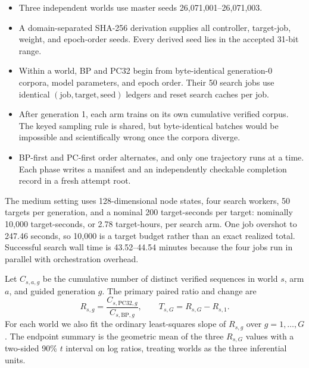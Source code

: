 \documentclass[11pt]{article}
\newcommand{\pc}{\mathrm{PC32}}
\newcommand{\bp}{\mathrm{BP}}
\begin{document}
\begin{itemize}
  \item Three independent worlds use master seeds 26,071,001--26,071,003.
  \item A domain-separated SHA-256 derivation supplies all controller, target-job, weight,
        and epoch-order seeds.  Every derived seed lies in the accepted 31-bit range.
  \item Within a world, BP and PC32 begin from byte-identical generation-0 corpora, model
        parameters, and epoch order.  Their 50 search jobs use identical
        $(\text{job},\text{target},\text{seed})$ ledgers and reset search caches per job.
  \item After generation 1, each arm trains on its own cumulative verified corpus.  The
        keyed sampling rule is shared, but byte-identical batches would be impossible and
        scientifically wrong once the corpora diverge.
  \item BP-first and PC-first order alternates, and only one trajectory runs at a time.
        Each phase writes a manifest and an independently checkable completion record in a
        fresh attempt root.
\end{itemize}

The medium setting uses 128-dimensional node states, four search workers, 50 targets per
generation, and a nominal 200 target-seconds per target: nominally 10,000 target-seconds,
or 2.78 target-hours, per search arm.  One job overshot to 247.46 seconds, so 10,000 is a
target budget rather than an exact realized total.  Successful search wall time is
43.52--44.54 minutes because the four jobs run in parallel with orchestration overhead.

Let $C_{s,a,g}$ be the cumulative number of distinct verified sequences in world $s$, arm
$a$, and guided generation $g$.  The primary paired ratio and change are
\[
  R_{s,g}=\frac{C_{s,\pc,g}}{C_{s,\bp,g}},
  \qquad
  T_{s,G}=R_{s,G}-R_{s,1}.
\]
For each world we also fit the ordinary least-squares slope of $R_{s,g}$ over
$g=1,\ldots,G$.  The endpoint summary is the geometric mean of the three $R_{s,G}$ values
with a two-sided 90\% $t$ interval on log ratios, treating worlds as the three inferential
units.
\end{document}
